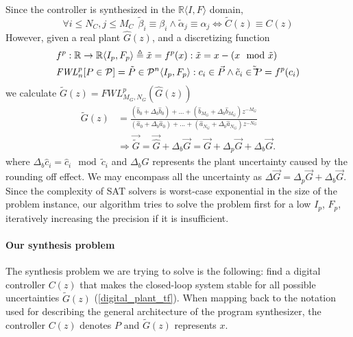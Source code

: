 \documentclass{sig-alternate-05-2015}
\begin{document}
Since the controller is synthesized in the $\mathbb{R}\langle I,F \rangle$
domain,
%
 $$\forall i \leq N_C, j \leq M_C\ \  \tilde \beta_{i} \equiv \beta_{i} \wedge \tilde \alpha_{j} \equiv \alpha_{j} \Leftrightarrow \tilde C(z) \equiv C(z)$$
%
However, given a real plant $\hat{G}(z)$, and a discretizing function
%
\begin{align}
\small
\label{FWL_tf}
&f^p : \mathbb{R} \rightarrow  \mathbb{R}\langle I_p,F_p \rangle \triangleq \tilde x = f^p(x) : \tilde x=x-(x\mod\tilde x)\\
&\mathit{FWL}_n^p[P \in \mathcal{P}] = \tilde P \in \mathcal{P}^{n}\langle I_p,F_p \rangle : c_i \in \vec{P} \wedge \tilde c_i \in \tilde \vec{P}=f^p(c_i)  \nonumber
\end{align}
%
we calculate $\tilde G(z)=FWL_{M_G,N_G}^p(\hat{G}(z))$
%
\begin{align}
\label{digital_plant_tf}
\tilde G(z)&=\frac{(\hat{b}_{0}+\Delta_b \hat{b}_{0}) +...+(\hat{b}_{M_G}+\Delta_b \hat{b}_{M_G})z^{-M_G}}{(\hat{a}_{0}+\Delta_b \hat{a}_{0})+...+(\hat{a}_{N_G}+\Delta_b \hat{a}_{N_G})z^{-N_G}} \nonumber \\
&\Rightarrow \vec{\tilde G} =\vec{\hat{G}}+\Delta_b{\vec{G}}=\vec{G}+\Delta_p{\vec{G}}+\Delta_b{\vec{G}}.
\end{align}
where $\Delta_b\hat{c}_i=\hat{c}_i\mod \tilde{c}_i$
and $\Delta_b{G}$ represents the plant uncertainty caused by
the rounding off effect.  We may encompass all the uncertainty as
$\Delta{\vec{G}}=\Delta_p{\vec{G}}+\Delta_b{\vec{G}}$. 
Since the complexity of SAT solvers is worst-case exponential in the size of
the problem instance, our algorithm tries to solve the problem first for a
low $I_p$, $F_p$, iteratively increasing the precision if it is insufficient.

\paragraph{Our synthesis problem}
The synthesis problem we are trying to solve is the following:
find a digital controller $C(z)$ %
that makes the closed-loop system stable 
for all possible uncertainties 
$\tilde G(z)$ (\ref{digital_plant_tf}).
When mapping back to the notation used for describing the general architecture 
of the program synthesizer, the controller $C(z)$ denotes $P$ and 
$\tilde G(z)$ represents $x$. 
\end{document}
